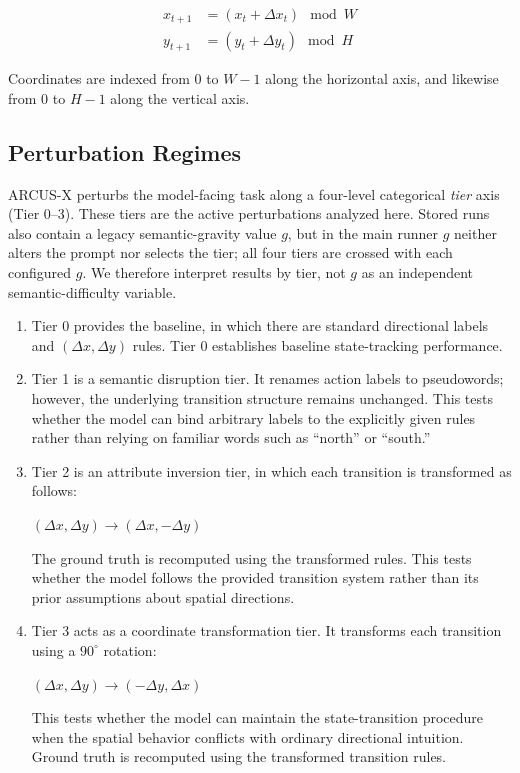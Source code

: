 \documentclass{article}
\begin{document}
\begin{align*}
    x_{t+1} &= (x_t + \Delta x_t) \mod W \\
    y_{t+1} &= (y_t + \Delta y_t) \mod H
\end{align*}

Coordinates are indexed from 0 to $W-1$ along the horizontal axis, and likewise from 0 to $H-1$ along the vertical axis.

\subsection{Perturbation Regimes}
\label{subsec:pert_regi}
ARCUS-X perturbs the model-facing task along a four-level categorical \emph{tier} axis (Tier 0--3). These tiers are the active perturbations analyzed here. Stored runs also contain a legacy semantic-gravity value $g$, but in the main runner $g$ neither alters the prompt nor selects the tier; all four tiers are crossed with each configured $g$. We therefore interpret results by tier, not $g$ as an independent semantic-difficulty variable.

\begin{enumerate}

    \item Tier 0 provides the baseline, in which there are standard directional labels and $(\Delta x, \Delta y)$ rules. Tier 0 establishes baseline state-tracking performance.

    \item Tier 1 is a semantic disruption tier. It renames action labels to pseudowords; however, the underlying transition structure remains unchanged. This tests whether the model can bind arbitrary labels to the explicitly given rules rather than relying on familiar words such as ``north'' or ``south.''

    \item Tier 2 is an attribute inversion tier, in which each transition is transformed as follows:

    $(\Delta x, \Delta y) \rightarrow (\Delta x, -\Delta y)$

    The ground truth is recomputed using the transformed rules. This tests whether the model follows the provided transition system rather than its prior assumptions about spatial directions.

    \item Tier 3 acts as a coordinate transformation tier. It transforms each transition using a $90^\circ$ rotation:

    $(\Delta x, \Delta y) \rightarrow (-\Delta y, \Delta x)$

    This tests whether the model can maintain the state-transition procedure when the spatial behavior conflicts with ordinary directional intuition. Ground truth is recomputed using the transformed transition rules.

\end{enumerate}
\end{document}

